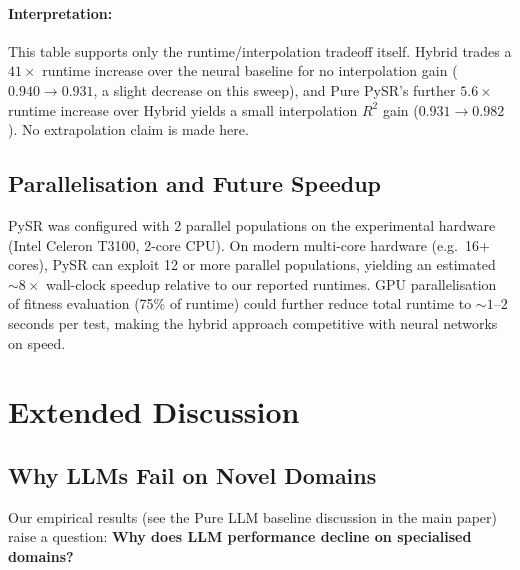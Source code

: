 \documentclass[twoside,11pt]{article}
\begin{document}
\paragraph{Interpretation:} This table supports only the runtime/interpolation tradeoff itself. Hybrid trades a $41\times$ runtime increase over the neural baseline for no interpolation gain ($0.940 \to 0.931$, a slight decrease on this sweep), and Pure PySR's further $5.6\times$ runtime increase over Hybrid yields a small interpolation $R^2$ gain ($0.931 \to 0.982$). No extrapolation claim is made here.

\subsection{Parallelisation and Future Speedup}

PySR was configured with 2 parallel populations on the experimental hardware (Intel Celeron T3100, 2-core CPU). On modern multi-core hardware (e.g.\ 16+ cores), PySR can exploit 12 or more parallel populations, yielding an estimated ${\sim}8\times$ wall-clock speedup relative to our reported runtimes. GPU parallelisation of fitness evaluation (75\% of runtime) could further reduce total runtime to ${\sim}1$--$2$ seconds per test, making the hybrid approach competitive with neural networks on speed.




\section{Extended Discussion}
\label{app:extended_discussion}

\subsection{Why LLMs Fail on Novel Domains}

Our empirical results (see the Pure LLM baseline discussion in the main paper) raise a question: \textbf{Why does LLM performance decline on specialised domains?}\citep{kambhampati2024llms}
\end{document}
